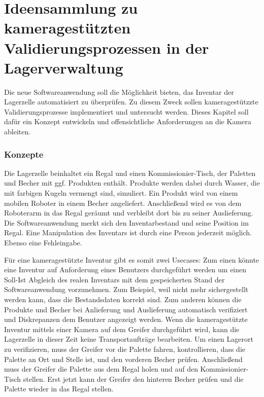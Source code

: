 \chapter{Ideensammlung zu kameragestützten Validierungsprozessen in der Lagerverwaltung}\label{Kap5}

Die neue Softwareanwendung soll die Möglichkeit bieten, das Inventar der Lagerzelle automatisiert zu überprüfen. 
Zu diesem Zweck sollen kameragestützzte Validierungsprozesse implementiert und untersucht werden. 
Dieses Kapitel soll dafür ein Konzept entwickeln und offensichtliche Anforderungen an die Kamera ableiten.

\subsection {Konzepte}

Die Lagerzelle beinhaltet ein Regal und einen Kommissionier-Tisch, der Paletten und Becher mit ggf. Produkten enthält.
Produkte werden dabei durch Wasser, die mit farbigen Kugeln vermengt sind, simuliert.
Ein Produkt wird von einem mobilen Roboter in einem Becher angeliefert. Anschließend wird es von dem Roboterarm in das Regal geräumt und verbleibt dort bis zu seiner Auslieferung.
Die Softwareanwendung merkt sich den Inventarbestand und seine Position im Regal.
Eine Manipulation des Inventars ist durch eine Person jederzeit möglich.
Ebenso eine Fehleingabe. 

Für eine kameragestützte Inventur gibt es somit zwei Usecases: 
Zum einen könnte eine Inventur auf Anforderung eines Benutzers durchgeführt werden um einen Soll-Ist Abgleich des realen Inventars mit 
dem gespeicherten Stand der Softwareanwendung vorzunehmen. 
Zum Beispiel, weil nicht mehr sichergestellt werden kann, dass die Bestandsdaten korrekt sind.
Zum anderen können die Produkte und Becher bei Anlieferung und Auslieferung automatisch verifiziert und Diskrepanzen dem Benutzer angezeigt werden.
Wenn die kameragestützte Inventur mittels einer Kamera auf dem Greifer durchgeführt wird, kann die Lagerzelle in dieser Zeit keine Transportaufträge bearbeiten.
Um einen Lagerort zu verifizieren, muss der Greifer vor die Palette fahren, kontrollieren, dass die Palette an Ort und Stelle ist, und den vorderen Becher prüfen. 
Anschließend muss der Greifer die Palette aus dem Regal holen und auf den Kommissionier-Tisch stellen.
Erst jetzt kann der Greifer den hinteren Becher prüfen und die Palette wieder in das Regal stellen.

